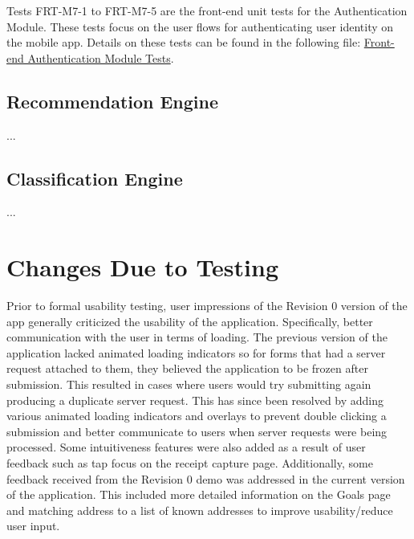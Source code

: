 \documentclass[12pt, titlepage]{article}
\begin{document}
Tests FRT-M7-1 to FRT-M7-5 are the front-end unit tests for the Authentication Module. These tests focus on the user flows for authenticating user identity on the mobile app. Details on these tests can be found in the following file: \href{https://github.com/allanfang1/grocery_spending_tracker_app/blob/main/test/profile_provider_test.dart}{Front-end Authentication Module Tests}.

\subsection{Recommendation Engine}

...

\subsection{Classification Engine}

...

\section{Changes Due to Testing}


Prior to formal usability testing, user impressions of the Revision 0 version of the app
generally criticized the usability of the application. Specifically, better communication with
the user in terms of loading. The previous version of the application lacked animated loading
indicators so for forms that had a server request attached to them, they believed the application
to be frozen after submission. This resulted in cases where users would try submitting again producing
a duplicate server request. This has since been resolved by adding various animated loading indicators
and overlays to prevent double clicking a submission and better communicate to users when server requests
were being processed. Some intuitiveness features were also added as a result of user feedback such as
tap focus on the receipt capture page. Additionally, some feedback received from the Revision 0 demo
was addressed in the current version of the application. This included more detailed information
on the Goals page and matching address to a list of known addresses to improve usability/reduce user
input.\\
\end{document}
